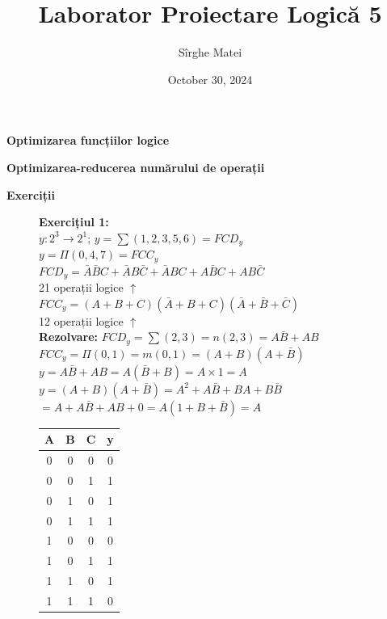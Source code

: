 \documentclass[12pt]{article}
\title{\bfseries Laborator Proiectare Logică 5}
\author{Sîrghe Matei}
\date{October 30, 2024}
\begin{document}
\maketitle

\begin{center}
    \large{\textbf{Optimizarea funcțiilor logice}}
\end{center}
\begin{center}
    \large{\textbf{Optimizarea-reducerea numărului de operații}}
\end{center}

\renewcommand{\arraystretch}{1}

\begin{center}
    \textbf{Exerciții}
\end{center}

\begin{figure}[h!]
    \begin{minipage}{0.8\textwidth}
        \textbf{Exercițiul 1:\\}
        $y: 2^3 \rightarrow 2^1$;
        $y = \sum(1,2,3,5,6)=FCD_{y}$\\
        $y = \Pi(0,4,7)=FCC_{y} $\\
        $FCD_{y}=\bar{A}\bar{B}C+\bar{A}B\bar{C}+\bar{A}BC+A\bar{B}C+AB\bar{C}$\\
        21 operații logice $\uparrow$\\
        $FCC_{y}=(A+B+C)(\bar{A}+B+C)(\bar{A}+\bar{B}+\bar{C})$\\
        12 operații logice $\uparrow$\\
        \textbf{Rezolvare:}
        $FCD_{y}=\sum(2,3)=n(2,3)=A\bar{B}+AB$\\
        $ FCC_{y}=\Pi(0,1)=m(0,1)=(A+B)(A+\bar{B}) $\\
        $ y= A\bar{B}+AB=A(\bar{B}+B)=A\times1=A$\\
        $y=(A+B)(A+\bar{B})=A^2+A\bar{B}+BA+B\bar{B}$\\
        $ =A+A\bar{B}+AB+0=A(1+B+\bar{B})=A$\\
    \end{minipage}
    \hfill
    \begin{minipage}{0.18\textwidth}
        \begin{tabular}{|c|c|c|c|}
            \hline
            A & B & C & y \\ \hline
            0 & 0 & 0 & 0 \\ \hline
            0 & 0 & 1 & 1 \\ \hline
            0 & 1 & 0 & 1 \\ \hline
            0 & 1 & 1 & 1 \\ \hline
            1 & 0 & 0 & 0 \\ \hline
            1 & 0 & 1 & 1 \\ \hline
            1 & 1 & 0 & 1 \\ \hline
            1 & 1 & 1 & 0 \\ \hline
        \end{tabular}
    \end{minipage}
\end{figure}
\end{document}
